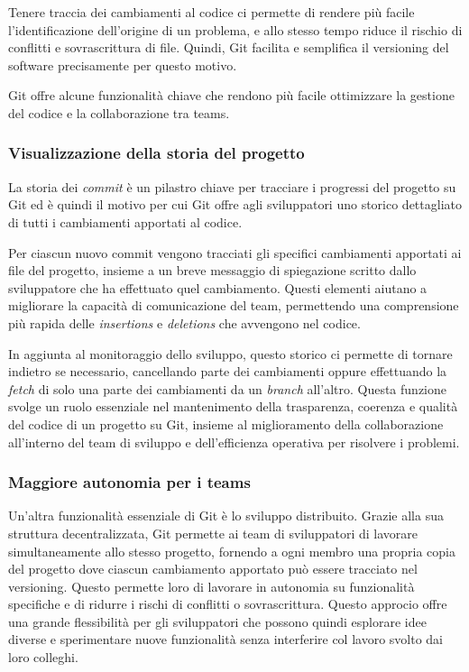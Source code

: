 Tenere traccia dei cambiamenti al codice ci permette di rendere più facile l'identificazione dell'origine di un problema, e allo stesso tempo riduce il rischio di conflitti e sovrascrittura di file. Quindi, Git facilita e semplifica il versioning del software precisamente per questo motivo.

Git offre alcune funzionalità chiave che rendono più facile ottimizzare la gestione del codice e la collaborazione tra teams.

\subsubsection{Visualizzazione della storia del progetto}
La storia dei \textit{commit} è un pilastro chiave per tracciare i progressi del progetto su Git ed è quindi il motivo per cui Git offre agli sviluppatori uno storico dettagliato di tutti i cambiamenti apportati al codice.

Per ciascun nuovo commit vengono tracciati gli specifici cambiamenti apportati ai file del progetto, insieme a un breve messaggio di spiegazione scritto dallo sviluppatore che ha effettuato quel cambiamento. Questi elementi aiutano a migliorare la capacità di comunicazione del team, permettendo una comprensione più rapida delle \textit{insertions} e \textit{deletions} che avvengono nel codice.

In aggiunta al monitoraggio dello sviluppo, questo storico ci permette di tornare indietro se necessario, cancellando parte dei cambiamenti oppure effettuando la \textit{fetch} di solo una parte dei cambiamenti da un \textit{branch} all'altro. Questa funzione svolge un ruolo essenziale nel mantenimento della trasparenza, coerenza e qualità del codice di un progetto su Git, insieme al miglioramento della collaborazione all'interno del team di sviluppo e dell'efficienza operativa per risolvere i problemi.

\subsubsection{Maggiore autonomia per i teams}
Un'altra funzionalità essenziale di Git è lo sviluppo distribuito. Grazie alla sua struttura decentralizzata, Git permette ai team di sviluppatori di lavorare simultaneamente allo stesso progetto, fornendo a ogni membro una propria copia del progetto dove ciascun cambiamento apportato può essere tracciato nel versioning. Questo permette loro di lavorare in autonomia su funzionalità specifiche e di ridurre i rischi di conflitti o sovrascrittura. Questo approcio offre una grande flessibilità per gli sviluppatori che possono quindi esplorare idee diverse e sperimentare nuove funzionalità senza interferire col lavoro svolto dai loro colleghi.

